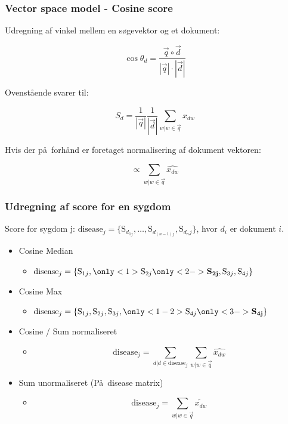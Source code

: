 \documentclass[xcolor=table]{beamer}
\begin{document}
\begin{frame}

  \frametitle{Vector space model - Cosine score}

  Udregning af vinkel mellem en søgevektor og et dokument:
  
  \[
  \cos \theta_{d} = \frac{\overrightarrow{q} \circ \overrightarrow{d}}{|\overrightarrow{q}| \cdot |\overrightarrow{d}|}
  \]
  
  Ovenst\aa ende svarer til:
  
  \[
  S_{d} = \frac{1}{|\overrightarrow{q}|}\frac{1}{|\overrightarrow{d}|} \sum_{w|w \in \overrightarrow{q}} x_{dw}
  \]
  
  Hvis der p\aa\ forh\aa nd er foretaget normalisering af dokument vektoren:
  
  \[
  \propto  \sum_{w|w \in \overrightarrow{q}} \widehat{x_{dw}}
  \]
  
\end{frame}

\begin{frame}

  \frametitle{Udregning af score for en sygdom}
  Score for sygdom j:
  $\textrm{disease}_j = \{\textrm{S}_{d_{1j}}, \ldots, 
  \textrm{S}_{d_{(n-1)j}}, \textrm{S}_{d_nj} \}$, hvor $d_i$ er dokument $i$.

  \begin{itemize}
    \item Cosine Median
      \begin{itemize}
        \item $ \textrm{disease}_j =
        \{\textrm{S}_{1j}, \only<1>{\textrm{S}_{2j}}
        \only<2->{\textbf{S}_{\mathbf{2j}}}, \textrm{S}_{3j},
        \textrm{S}_{4j} \}$
      \end{itemize}
    \item Cosine Max
      \begin{itemize}
        \item $ \textrm{disease}_j =
        \{\textrm{S}_{1j}, \textrm{S}_{2j},
        \textrm{S}_{3j}, \only<1-2>{\textrm{S}_{4j}}
        \only<3->{\textbf{S}_{\mathbf{4j}}} \}$
      \end{itemize}
    \item Cosine / Sum normaliseret
      \begin{itemize}
        \item \[ \textrm{disease}_j = \sum_{d | d \in \textrm{disease}_j} \sum_{w|w \in \overrightarrow{q}} \widehat{x_{dw}} \]
      \end{itemize}
    \item Sum unormaliseret (P\aa\ disease matrix)
      \begin{itemize}
        \item \[ \textrm{disease}_j = \sum_{w|w \in \overrightarrow{q}} \widetilde{x_{dw}} \]
      \end{itemize}
  \end{itemize}

\end{frame}
\end{document}
